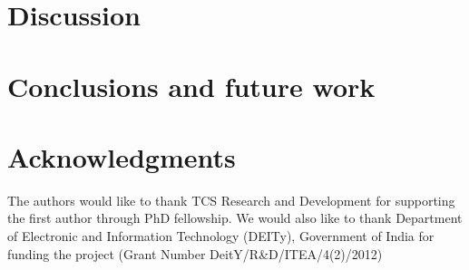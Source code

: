 \documentclass{sig-alternate}
\begin{document}
\section{Discussion}

\section{Conclusions and future work}
\label{sec:conclusions}

\section{Acknowledgments}
The authors would like to thank TCS Research and Development for supporting the first author through PhD fellowship. We would also like to thank Department of Electronic and Information Technology (DEITy), Government of India for funding the project (Grant Number DeitY/R\&D/ITEA/4(2)/2012)


\end{document}
